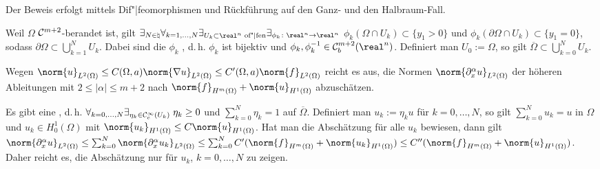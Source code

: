 \begin{Bem}
    Der Beweis erfolgt mittels Dif"|feomorphismen und Rückführung auf den Ganz- und den
    Halbraum-Fall.
    
    Weil $\Omega$ $\mathcal{C}^{m+2}$-berandet ist, gilt
    $\exists_{N \in \natural} \forall_{k = 1, \dotsc, N}
    \exists_{U_k \subset \real^n \text{ of"|fen}}
    \exists_{\phi_k\colon \real^n \rightarrow \real^n}$
    $\phi_k(\Omega \cap U_k) \subset \{y_1 > 0\}$ und
    $\phi_k(\partial\Omega \cap U_k) \subset \{y_1 = 0\}$, sodass
    $\partial\Omega \subset \bigcup_{k=1}^N U_k$.
    Dabei sind die $\phi_k$ , d.\,h.
    $\phi_k$ ist bijektiv und $\phi_k, \phi_k^{-1} \in \C^{m+2}_b(\real^n)$.
    Definiert man $U_0 := \Omega$, so gilt $\overline{\Omega} \subset \bigcup_{k=0}^N U_k$.
    
    Wegen $\norm{u}_{L^2(\Omega)} \le C(\Omega, a) \norm{\nabla u}_{L^2(\Omega)} \le
    C'(\Omega, a) \norm{f}_{L^2(\Omega)}$ reicht es aus, die Normen
    $\norm{\partial_x^\alpha u}_{L^2(\Omega)}$ der höheren Ableitungen mit
    $2 \le |\alpha| \le m + 2$ nach $\norm{f}_{H^m(\Omega)} + \norm{u}_{H^1(\Omega)}$
    abzuschätzen.
    
    Es gibt eine , d.\,h.
    $\forall_{k=0,\dotsc,N} \exists_{\eta_k \in \mathcal{C}^\infty_c(U_k)}\;
    \eta_k \ge 0$ und $\sum_{k=0}^N \eta_k = 1$ auf $\overline{\Omega}$.
    Definiert man $u_k := \eta_k u$ für $k = 0, \dotsc, N$, so gilt
    $\sum_{k=0}^N u_k = u$ in $\Omega$ und $u_k \in H^1_0(\Omega)$ mit
    $\norm{u_k}_{H^1(\Omega)} \le C \norm{u}_{H^1(\Omega)}$.
    Hat man die Abschätzung für alle $u_k$ bewiesen, dann gilt\\
    $\norm{\partial_x^\alpha u}_{L^2(\Omega)}
    \le \sum_{k=0}^N \norm{\partial_x^\alpha u_k}_{L^2(\Omega)}
    \le \sum_{k=0}^N C' (\norm{f}_{H^m(\Omega)} + \norm{u_k}_{H^1(\Omega)})
    \le C'' (\norm{f}_{H^m(\Omega)} + \norm{u}_{H^1(\Omega)})$.
    Daher reicht es, die Abschätzung nur für $u_k$, $k = 0, \dotsc, N$ zu zeigen.
%     
\end{Bem}

